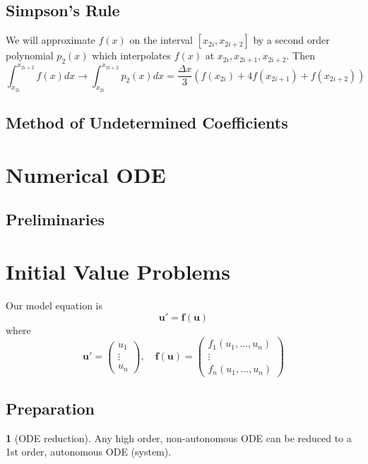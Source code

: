 \documentclass[12pt]{article}
\theoremstyle{definition}
\newtheorem{theorem}{\color{ForestGreen}{\textbf{Theorem}}}
\theoremstyle{definition}
\begin{document}
\subsection{Simpson's Rule}
We will approximate $f(x)$ on the interval $[x_{2i},x_{2i+2}]$ by a second order polynomial $p_2(x)$ which interpolates $f(x)$ at $x_{2i}, x_{2i+1}, x_{2i+2}$. Then
\begin{equation}
	\int_{x_{2i}}^{x_{2i+2}}  f(x)dx \to \int_{x_{2i}}^{x_{2i+2}}p_2(x) dx = \frac{\Delta x}{3}(f(x_{2i}) + 4f(x_{2i+1}) + f(x_{2i+2}))
\end{equation}

\subsection{Method of Undetermined Coefficients}


\section{Numerical ODE}

\subsection{Preliminaries}

\section{Initial Value Problems}
Our model equation is
\begin{equation}
	\bm u' = \bm f (\bm u)
\end{equation}
where
\begin{equation}
	\bm u' 
	= 
	\begin{pmatrix}
	u_1 \\ \vdots \\ u_n
	\end{pmatrix}, \quad
	\bm f (\bm u) = 
	\begin{pmatrix}
	f_1(u_1, \ldots, u_n) \\ \vdots \\ f_n(u_1, \ldots, u_n)
	\end{pmatrix}
\end{equation}

\subsection{Preparation}
\begin{theorem}[ODE reduction]
	Any high order, non-autonomous ODE can be reduced to a 1st order, autonomous ODE (system).
\end{theorem}
\end{document}
